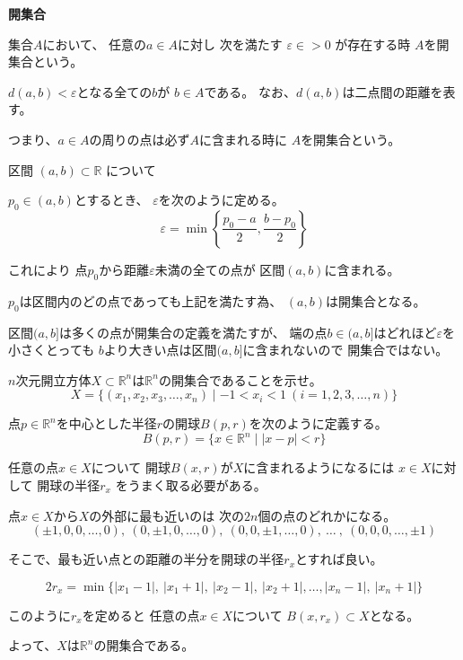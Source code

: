 \documentclass[12pt,b5paper]{ltjsarticle}
\begin{document}
\textbf{開集合}

集合$A$において、
任意の$a\in A$に対し
次を満たす $\varepsilon\in >0$ が存在する時
$A$を開集合という。

$d(a,b)<\varepsilon$となる全ての$b$が
$b\in A$である。
なお、$d(a,b)$は二点間の距離を表す。


つまり、$a\in A$の周りの点は必ず$A$に含まれる時に
$A$を開集合という。


\dotfill

区間
$(a,b) \subset \mathbb{R}$
について

$p_0 \in (a,b)$とするとき、
$\varepsilon$を次のように定める。
\begin{equation}
 \varepsilon = \min \left\{ \frac{p_0-a}{2}, \frac{b-p_0}{2} \right\}
\end{equation}

これにより 点$p_0$から距離$\varepsilon$未満の全ての点が
区間$(a,b)$に含まれる。

$p_0$は区間内のどの点であっても上記を満たす為、
$(a,b)$は開集合となる。


区間$(a,b]$は多くの点が開集合の定義を満たすが、
端の点$b\in (a,b]$はどれほど$\varepsilon$を小さくとっても
$b$より大きい点は区間$(a,b]$に含まれないので
開集合ではない。

\hrulefill

$n$次元開立方体$X\subset\mathbb{R}^n$は$\mathbb{R}^n$の開集合であることを示せ。
\begin{equation}
 X = \{ (x_1,x_2,x_3,\dots ,x_n) \mid -1<x_i<1 \ (i=1,2,3,\dots,n) \}
\end{equation}

\dotfill

点$p\in\mathbb{R}^n$を中心とした半径$r$の開球$B(p,r)$を次のように定義する。
\begin{equation}
 B(p,r) = \{ x \in\mathbb{R}^n \mid \lvert x-p \rvert < r \}
\end{equation}

任意の点$x\in X$について
開球$B(x,r)$が$X$に含まれるようになるには
$x\in X$に対して
開球の半径$r_x$
をうまく取る必要がある。

点$x\in X$から$X$の外部に最も近いのは
次の$2n$個の点のどれかになる。
\begin{equation}
 (\pm 1, 0,0,\dots , 0),\
 (0,\pm 1, 0,\dots , 0),\
 (0,0,\pm 1, \dots , 0),\
 \dots \ ,\
 (0,0,0,\dots , \pm 1)
\end{equation}

そこで、最も近い点との距離の半分を開球の半径$r_x$とすれば良い。

\begin{equation}
 2 r_x =
 \min \{
 | x_1 - 1 |,\ | x_1 + 1 |,\ | x_2 - 1 |,\ | x_2 + 1 |, \dots , | x_n - 1 |,\ | x_n + 1 |
 \}
\end{equation}

このように$r_x$を定めると
任意の点$x\in X$について
$B(x,r_x) \subset X$となる。

よって、$X$は$\mathbb{R}^n$の開集合である。
\end{document}
